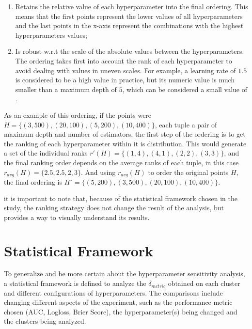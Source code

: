 \begin{enumerate}
    \item Retains the relative value of each hyperparameter into the final ordering. This means that the first points represent the lower values of all hyperparameters and the last points in the x-axis represent the combinations with the highest hyperparameters values;
    \item Is robust w.r.t the scale of the absolute values between the hyperparameters. The ordering takes first into account the rank of each hyperparameter to avoid dealing with values in uneven scales. For example, a learning rate of $1.5$ is considered to be a high value in practice, but its numeric value is much smaller than a maximum depth of $5$, which can be considered a small value of .
\end{enumerate}


As an example of this ordering, if the points were $H = \{(3, 500), (20, 100), (5, 200), (10, 400)\}$, each tuple a 
pair of maximum depth and number of estimators, the first step of the ordering is to get the ranking of each hyperparameter within it is distribution. This would generate a set of the individual ranks $r'(H) = \{(1, 4), (4, 1), (2, 2), (3, 3)\}$, and the final ranking order depends on the average ranks of each tuple, in this case $r_{avg}(H) = \{2.5, 2.5, 2, 3\}$. And using $r_{avg}(H)$ to order the original points $H$, the final ordering is $H^\star = \{(5, 200), (3, 500), (20, 100), (10, 400)\}$.

it is important to note that, because of the statistical framework chosen in the study, the ranking strategy does not change the result of the analysis, but provides a way to visually understand its results.

\section{Statistical Framework}

To generalize and be more certain about the hyperparameter sensitivity analysis, a statistical framework is defined to analyze the $\delta_{metric}$ obtained on each cluster and different configurations of hyperparameters. The comparisons include changing different aspects of the experiment, such as the performance metric chosen (AUC, Logloss, Brier Score), the hyperparameter(s) being changed and the clusters being analyzed.

